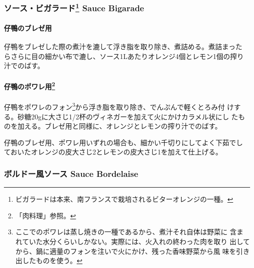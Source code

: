 \documentclass[twoside,12Q,b5paper]{escoffierltjsbook}
\newenvironment{recette}{\begin{small}\begin{spacing}{1}\begin{multicols}{2}}{\end{multicols}\end{spacing}\end{small}}
\begin{document}
\begin{recette}%
  
\subsubsection*{\texorpdfstring{ソース・ビガラード\footnote{ビガラードは本来、南フランスで栽培されるビターオレンジの一種。}
Sauce
Bigarade}{ソース・ビガラード Sauce Bigarade}}\label{ux30bdux30fcux30b9ux30d3ux30acux30e9ux30fcux30c92-1-sauce-bigarade}

\paragraph{仔鴨のブレゼ用}\label{ux4ed4ux9d28ux306eux30d6ux30ecux30bcux7528}

仔鴨をブレゼした際の煮汁を漉して浮き脂を取り除き、煮詰める。煮詰まった
らさらに目の細かい布で漉し、ソース1Lあたりオレンジ4個とレモン1個の搾り
汁でのばす。

\paragraph{\texorpdfstring{仔鴨のポワレ用\footnote{「肉料理」参照。}}{仔鴨のポワレ用}}\label{ux4ed4ux9d28ux306eux30ddux30efux30ecux75282-2}

仔鴨をポワレのフォン\footnote{ここでのポワレは蒸し焼きの一種であるから、煮汁それ自体は野菜に
  含まれていた水分くらいしかない。実際には、火入れの終わった肉を取り
  出してから、鍋に適量のフォンを注いで火にかけ、残った香味野菜から風
  味を引き出したものを使う。}から浮き脂を取り除き、でんぷんで軽くとろみ付
けする。砂糖20gに大さじ1/2杯のヴィネガーを加えて火にかけカラメル状にし
たものを加える。ブレゼ用と同様に、オレンジとレモンの搾り汁でのばす。

仔鴨のブレゼ用、ポワレ用いずれの場合も、細かい千切りにしてよく下茹でし
ておいたオレンジの皮大さじ2とレモンの皮大さじ1を加えて仕上げる。

\subsubsection*{ボルドー風ソース Sauce
Bordelaise}\label{ux30dcux30ebux30c9ux30fcux98a8ux30bdux30fcux30b9-sauce-bordelaise}


\end{recette}
\end{document}
